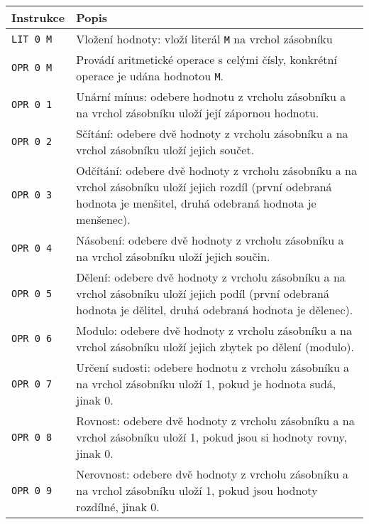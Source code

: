 \documentclass{article}
\begin{document}
	
	\begin{longtable}{|l| p{10cm}|}
		\hline
		Instrukce & Popis \\ 
		\hline\hline
		
		\rule{0pt}{3ex} \texttt{LIT 0 M} & Vložení hodnoty: vloží literál \texttt{M} na vrchol zásobníku \\ \hline
		
		\rule{0pt}{3ex} \texttt{OPR 0 M} & Provádí aritmetické operace s celými čísly, konkrétní operace je udána hodnotou \texttt{M}. \\
		
		\rule{0pt}{4ex} \texttt{OPR 0 1} & Unární mínus: odebere hodnotu z vrcholu zásobníku a na vrchol zásobníku uloží její zápornou hodnotu. \\
		
		\rule{0pt}{4ex} \texttt{OPR 0 2} & Sčítání: odebere dvě hodnoty z vrcholu zásobníku a na vrchol zásobníku uloží jejich součet. \\
		
		\rule{0pt}{4ex} \texttt{OPR 0 3} & Odčítání: odebere dvě hodnoty z vrcholu zásobníku a na vrchol zásobníku uloží jejich rozdíl (první odebraná hodnota je menšitel, druhá odebraná hodnota je menšenec). \\
		
		\rule{0pt}{4ex} \texttt{OPR 0 4} & Násobení: odebere dvě hodnoty z vrcholu zásobníku a na vrchol zásobníku uloží jejich součin. \\
		
		\rule{0pt}{4ex} \texttt{OPR 0 5} & Dělení: odebere dvě hodnoty z vrcholu zásobníku a na vrchol zásobníku uloží jejich podíl (první odebraná hodnota je dělitel, druhá odebraná hodnota je dělenec). \\
		
		\rule{0pt}{4ex} \texttt{OPR 0 6} & Modulo: odebere dvě hodnoty z vrcholu zásobníku a na vrchol zásobníku uloží jejich zbytek po dělení (modulo). \\
		
		\rule{0pt}{4ex} \texttt{OPR 0 7} & Určení sudosti: odebere hodnotu z vrcholu zásobníku a na vrchol zásobníku uloží 1, pokud je hodnota sudá, jinak 0. \\
		
		\rule{0pt}{4ex} \texttt{OPR 0 8} & Rovnost: odebere dvě hodnoty z vrcholu zásobníku a na vrchol zásobníku uloží 1, pokud jsou si hodnoty rovny, jinak 0. \\
		
		\rule{0pt}{4ex} \texttt{OPR 0 9} & Nerovnost: odebere dvě hodnoty z vrcholu zásobníku a na vrchol zásobníku uloží 1, pokud jsou hodnoty rozdílné, jinak 0. \\
		

\end{longtable}
\end{document}
